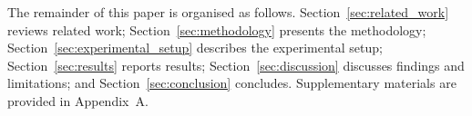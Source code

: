 The remainder of this paper is organised as follows. Section~\ref{sec:related_work} reviews related work; Section~\ref{sec:methodology} presents the methodology; Section~\ref{sec:experimental_setup} describes the experimental setup; Section~\ref{sec:results} reports results; Section~\ref{sec:discussion} discusses findings and limitations; and Section~\ref{sec:conclusion} concludes. Supplementary materials are provided in Appendix~A.
